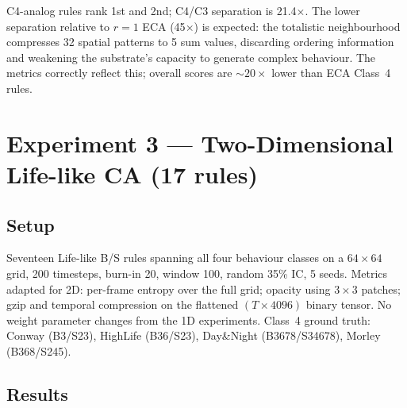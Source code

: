 \documentclass[12pt,a4paper]{article}
\begin{document}
C4-analog rules rank 1st and 2nd; C4/C3 separation is 21.4$\times$.
The lower separation relative to $r{=}1$ ECA (45$\times$) is expected:
the totalistic neighbourhood compresses 32 spatial patterns to 5 sum values,
discarding ordering information and weakening the substrate's capacity to
generate complex behaviour.
The metrics correctly reflect this; overall scores are $\sim 20\times$ lower
than ECA Class~4 rules.

\section{Experiment 3 --- Two-Dimensional Life-like CA (17 rules)}

\subsection{Setup}

Seventeen Life-like B/S rules spanning all four behaviour classes on a
$64 \times 64$ grid, 200 timesteps, burn-in 20, window 100, random 35\% IC,
5 seeds.
Metrics adapted for 2D: per-frame entropy over the full grid; opacity using
$3 \times 3$ patches; gzip and temporal compression on the flattened
$(T \times 4096)$ binary tensor.
No weight parameter changes from the 1D experiments.
Class~4 ground truth: Conway (B3/S23), HighLife (B36/S23), Day\&Night
(B3678/S34678), Morley (B368/S245).

\subsection{Results}
\end{document}
